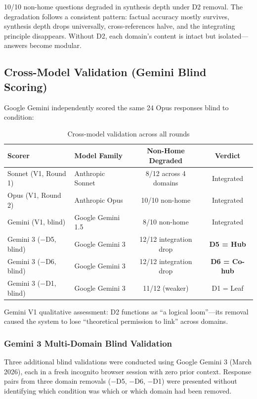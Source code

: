 \documentclass[12pt,letterpaper]{article}
\begin{document}
10/10 non-home questions degraded in synthesis depth under D2 removal. The degradation follows a consistent pattern: factual accuracy mostly survives, synthesis depth drops universally, cross-references halve, and the integrating principle disappears. Without D2, each domain's content is intact but isolated---answers become modular.

\subsection{Cross-Model Validation (Gemini Blind Scoring)}

Google Gemini independently scored the same 24 Opus responses blind to condition:

\begin{table}[H]
\centering
\caption{Cross-model validation across all rounds}
\label{tab:cross-model}
\begin{tabular}{llcc}
\toprule
\textbf{Scorer} & \textbf{Model Family} & \textbf{Non-Home Degraded} & \textbf{Verdict} \\
\midrule
Sonnet (V1, Round 1) & Anthropic Sonnet & 8/12 across 4 domains & Integrated \\
Opus (V1, Round 2) & Anthropic Opus & 10/10 non-home & Integrated \\
Gemini (V1, blind) & Google Gemini 1.5 & 8/10 non-home & Integrated \\
Gemini 3 ($-$D5, blind) & Google Gemini 3 & 12/12 integration drop & \textbf{D5 = Hub} \\
Gemini 3 ($-$D6, blind) & Google Gemini 3 & 12/12 integration drop & \textbf{D6 = Co-hub} \\
Gemini 3 ($-$D1, blind) & Google Gemini 3 & 11/12 (weaker) & D1 = Leaf \\
\bottomrule
\end{tabular}
\end{table}

Gemini V1 qualitative assessment: D2 functions as ``a logical loom''---its removal caused the system to lose ``theoretical permission to link'' across domains.

\subsubsection{Gemini 3 Multi-Domain Blind Validation}

Three additional blind validations were conducted using Google Gemini 3 (March 2026), each in a fresh incognito browser session with zero prior context. Response pairs from three domain removals ($-$D5, $-$D6, $-$D1) were presented without identifying which condition was which or which domain had been removed.
\end{document}
